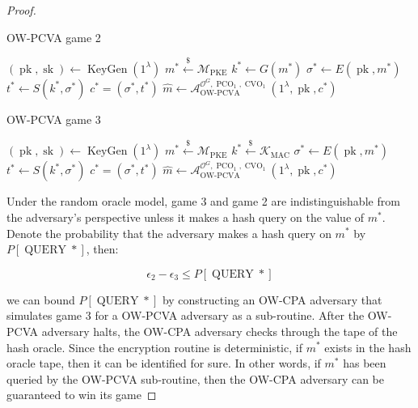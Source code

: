 \documentclass{article}
\newcommand{\leftsample}{\overset{{\scriptscriptstyle\$}}{\leftarrow}}
\newcommand{\keygen}{\operatorname{KeyGen}}
\newcommand{\pk}{\operatorname{pk}}
\newcommand{\sk}{\operatorname{sk}}
\newcommand{\pco}{\operatorname{PCO}}
\newcommand{\cvo}{\operatorname{CVO}}
\newcommand{\llbrack}{[\![}
\newcommand{\rrbrack}{]\!]}
\begin{document}
\begin{proof}
    \begin{multicols}{2}
        \begin{algorithm}[H]
            \caption{OW-PCVA game 2}
            \SetAlgoLined
            $(\pk, \sk) \leftarrow \keygen(1^\lambda)$\;
            $m^\ast \leftsample \mathcal{M}_\text{PKE}$\;
            $k^\ast \leftarrow G(m^\ast)$\;
            $\sigma^\ast \leftarrow E(\pk, m^\ast)$\;
            $t^\ast \leftarrow S(k^\ast, \sigma^\ast)$\;
            $c^\ast = (\sigma^\ast, t^\ast)$\;
            $\hat{m} \leftarrow \mathcal{A}_\text{OW-PCVA}^{
                \mathcal{O}^G, \pco_1, \cvo_1
            }(1^\lambda, \pk, c^\ast)$\;
            \Return{$\llbrack \hat{m} = m^\ast \rrbrack$}
        \end{algorithm}

        \begin{algorithm}[H]
            \caption{OW-PCVA game 3}
            \SetAlgoLined
            $(\pk, \sk) \leftarrow \keygen(1^\lambda)$\;
            $m^\ast \leftsample \mathcal{M}_\text{PKE}$\;
            $k^\ast \leftsample \mathcal{K}_\text{MAC}$\;
            $\sigma^\ast \leftarrow E(\pk, m^\ast)$\;
            $t^\ast \leftarrow S(k^\ast, \sigma^\ast)$\;
            $c^\ast = (\sigma^\ast, t^\ast)$\;
            $\hat{m} \leftarrow \mathcal{A}_\text{OW-PCVA}^{
                \mathcal{O}^G, \pco_1, \cvo_1
            }(1^\lambda, \pk, c^\ast)$\;
            \Return{$\llbrack \hat{m} = m^\ast \rrbrack$}
        \end{algorithm}
    \end{multicols}
    
    
    Under the random oracle model, game 3 and game 2 are indistinguishable from the adversary's perspective unless it makes a hash query on the value of $m^\ast$. Denote the probability that the adversary makes a hash query on $m^\ast$ by $P[\operatorname{QUERY}\ast]$, then:

    \begin{equation*}
        \epsilon_2 - \epsilon_3 \leq P[\operatorname{QUERY}\ast]
    \end{equation*}

    we can bound $P[\operatorname{QUERY}\ast]$ by constructing an OW-CPA adversary that simulates game 3 for a OW-PCVA adversary as a sub-routine. After the OW-PCVA adversary halts, the OW-CPA adversary checks through the tape of the hash oracle. Since the encryption routine is deterministic, if $m^\ast$ exists in the hash oracle tape, then it can be identified for sure. In other words, if $m^\ast$ has been queried by the OW-PCVA sub-routine, then the OW-CPA adversary can be guaranteed to win its game


\end{proof}
\end{document}
